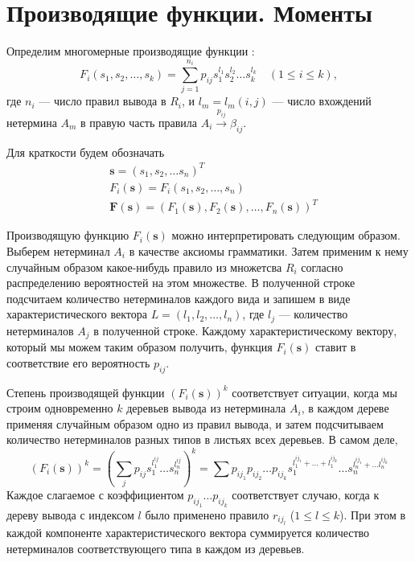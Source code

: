 \documentclass[12pt]{article}
\renewcommand{\leq}{\leqslant}
\begin{document}
\section{Производящие функции. Моменты}

Определим многомерные производящие функции \cite{fu-struct}:
\begin{equation*}
\label{eq:f-def}
	F_i(s_1, s_2, \ldots, s_k) = \sum_{j = 1}^{n_i} p_{ij} s_1^{l_1} s_2^{l_2} \ldots s_k^{l_k}\quad (1 \leq i \leq k),
\end{equation*}
где $n_i$ --- число правил вывода в $R_i$, и $l_m = l_m(i, j)$ --- число вхождений нетермина $A_m$ в правую часть правила $A_i \xrightarrow{p_{ij}} \beta_{ij}$.

Для краткости будем обозначать
\begin{equation*}
\begin{split}
	&\mathbf{s} = (s_1, s_2, \ldots s_n)^T \\
	&F_i(\mathbf{s}) = F_i(s_1, s_2, \ldots, s_n) \\
	&\mathbf{F}(\mathbf{s}) = (F_1(\mathbf{s}), F_2(\mathbf{s}), \ldots, F_n(\mathbf{s}))^T
\end{split}
\end{equation*}

Производящую функцию $F_i(\mathbf{s})$ можно интерпретировать следующим образом. Выберем нетерминал $A_i$ в качестве аксиомы грамматики. Затем применим к нему случайным образом какое-нибудь правило из множетсва $R_i$ согласно распределению вероятностей на этом множестве. В полученной строке подсчитаем количество нетерминалов каждого вида и запишем в виде характеристического вектора $L = (l_1, l_2, \ldots, l_n)$, где $l_j$ --- количество нетерминалов $A_j$ в полученной строке. Каждому характеристическому вектору, который мы можем таким образом получить, функция $F_i(\mathbf{s})$ ставит в соответствие его вероятность $p_{ij}$.

Степень производящей функции $(F_i(\mathbf{s}))^k$ соответствует ситуации, когда мы строим одновременно $k$ деревьев вывода из нетерминала $A_i$, в каждом дереве применяя случайным образом одно из правил вывода, и затем подсчитываем количество нетерминалов разных типов в листьях всех деревьев. В самом деле,
\begin{equation}
\label{eq:f-powers}
	(F_i(\mathbf{s}))^k = \left( \sum_j p_{ij} s_1^{l^{ij}_1} \ldots s_n^{l^{ij}_n} \right)^k = \sum p_{ij_1} p_{ij_2} \ldots p_{ij_k} s_1^{l^{ij_1}_1 + \ldots + l^{ij_k}_1} \ldots s_n^{l^{ij_1}_n + \ldots l^{ij_k}_n}
\end{equation}
Каждое слагаемое с коэффициентом $p_{ij_1} \ldots p_{ij_k}$ соответствует случаю, когда к дереву вывода с индексом $l$ было применено правило $r_{ij_l}$ ($1 \leq l \leq k$). При этом в каждой компоненте характеристического вектора суммируется количество нетерминалов соответствующего типа в каждом из деревьев.
\end{document}
